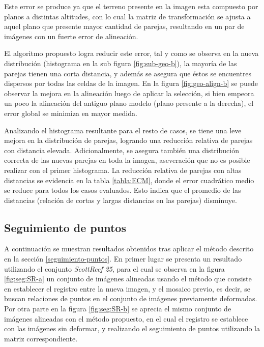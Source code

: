 Este error se produce ya que el terreno presente en la imagen esta compuesto por planos a distintas altitudes, con lo cual la matriz de transformación se ajusta a aquel plano que presente mayor cantidad de parejas, resultando en un par de imágenes con un fuerte error de alineación. 

El algoritmo propuesto logra reducir este error, tal y como se observa en la nueva distribución (histograma en la sub figura \ref{fig:sub-geo-b}), la mayoría de las parejas tienen una corta distancia, y además se asegura que éstos se encuentres dispersos por todas las celdas de la imagen. En la figura \ref{fig:geo-align-b} se puede observar la mejora en la alineación luego de aplicar la selección, si bien empeora un poco la alineación del antiguo plano modelo (plano presente a la derecha), el error global se minimiza en mayor medida. 

Analizando el histograma resultante para el resto de casos, se tiene una leve mejora en la distribución de parejas, logrando una reducción relativa de parejas con distancia elevada. Adicionalmente, se asegura también una distribución correcta de las nuevas parejas en toda la imagen, aseveración que no es posible realizar con el primer histograma. La reducción relativa de parejas con altas distancias se evidencia en la tabla \ref{tabla:ECM}, donde el error cuadrático medio se reduce para todos los casos evaluados. Esto indica que el promedio de las distancias (relación de cortas y largas distancias en las parejas) disminuye.

\subsection*{Seguimiento de puntos}

A continuación se muestran resultados obtenidos tras aplicar el método descrito en la sección \ref{seguimiento-puntos}. En primer lugar se presenta un resultado utilizando el conjunto \textit{ScottReef 25}, para el cual se observa en la figura \ref{fig:seg:SR-a} un conjunto de imágenes alineadas usando el método que consiste en establecer el registro entre la nueva imagen, y el mosaico previo, es decir, se buscan relaciones de puntos en el conjunto de imágenes previamente deformadas. Por otra parte en la figura \ref{fig:seg:SR-b} se aprecia el mismo conjunto de imágenes alineadas con el método propuesto, en el cual el registro se establece con las imágenes sin deformar, y realizando el seguimiento de puntos utilizando la matriz correspondiente.

